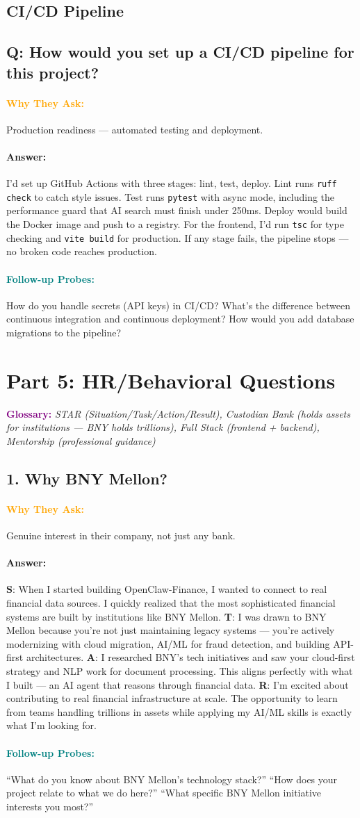 \documentclass[11pt,a4paper]{article}
\newcommand{\Q}[1]{\subsection{#1}}
\newcommand{\Ans}[1]{\paragraph{\textbf{Answer:}} #1}
\newcommand{\Why}{\paragraph{\textcolor{orange}{\textbf{Why They Ask:}}}}
\newcommand{\Probe}{\paragraph{\textcolor{teal}{\textbf{Follow-up Probes:}}}}
\begin{document}
\subsection{CI/CD Pipeline}

\Q{Q: How would you set up a CI/CD pipeline for this project?}
\Why Production readiness --- automated testing and deployment.
\Ans I'd set up GitHub Actions with three stages: lint, test, deploy. Lint runs \texttt{ruff check} to catch style issues. Test runs \texttt{pytest} with async mode, including the performance guard that AI search must finish under 250ms. Deploy would build the Docker image and push to a registry. For the frontend, I'd run \texttt{tsc} for type checking and \texttt{vite build} for production. If any stage fails, the pipeline stops --- no broken code reaches production.
\Probe How do you handle secrets (API keys) in CI/CD? What's the difference between continuous integration and continuous deployment? How would you add database migrations to the pipeline?

\newpage
\section{Part 5: HR/Behavioral Questions}

\textcolor{purple}{\textbf{Glossary:}} \textit{STAR (Situation/Task/Action/Result), Custodian Bank (holds assets for institutions --- BNY holds trillions), Full Stack (frontend + backend), Mentorship (professional guidance)}

\Q{1. Why BNY Mellon?}
\Why Genuine interest in their company, not just any bank.
\Ans \textbf{S}: When I started building OpenClaw-Finance, I wanted to connect to real financial data sources. I quickly realized that the most sophisticated financial systems are built by institutions like BNY Mellon. \textbf{T}: I was drawn to BNY Mellon because you're not just maintaining legacy systems --- you're actively modernizing with cloud migration, AI/ML for fraud detection, and building API-first architectures. \textbf{A}: I researched BNY's tech initiatives and saw your cloud-first strategy and NLP work for document processing. This aligns perfectly with what I built --- an AI agent that reasons through financial data. \textbf{R}: I'm excited about contributing to real financial infrastructure at scale. The opportunity to learn from teams handling trillions in assets while applying my AI/ML skills is exactly what I'm looking for.
\Probe ``What do you know about BNY Mellon's technology stack?'' ``How does your project relate to what we do here?'' ``What specific BNY Mellon initiative interests you most?''
\end{document}
